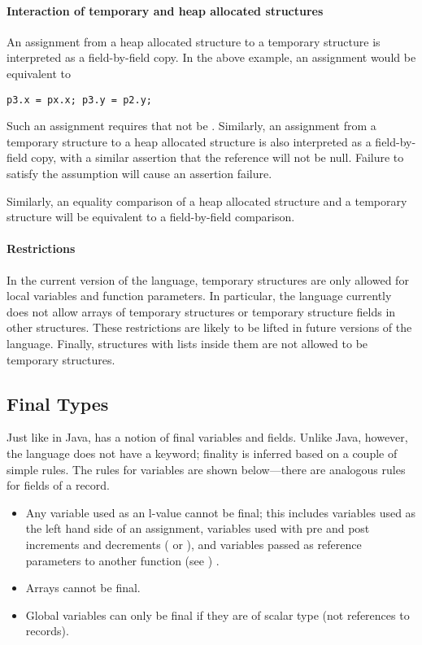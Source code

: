 \paragraph{Interaction of temporary and heap allocated structures}
An assignment from a heap allocated structure to a temporary structure is interpreted as a field-by-field copy. In the above example, an assignment  would be equivalent to
\begin{lstlisting}
p3.x = px.x; p3.y = p2.y;
\end{lstlisting}
Such an assignment requires that  not be . Similarly, an assignment from a temporary structure to a heap allocated structure is also interpreted as a field-by-field copy, with a similar assertion that the reference will not be null. Failure to satisfy the assumption will cause an assertion failure.

Similarly, an equality comparison of a heap allocated structure and a temporary structure will be equivalent to a field-by-field comparison.

\paragraph{Restrictions}
In the current version of the language, temporary structures are only allowed for local variables and function parameters. In particular, the language currently does not allow arrays of temporary structures or temporary structure fields in other structures. These restrictions are likely to be lifted in future versions of the language. Finally, structures with lists inside them are not allowed to be temporary structures.




\subsection{Final Types}
Just like in Java, \Sk{} has a notion of final variables and fields. Unlike Java, however, the language does not have a  keyword; finality is inferred based on a couple of simple rules. The rules for variables are shown below---there are analogous rules for fields of a record.

\begin{itemize}
\item Any variable used as an l-value cannot be final; this includes variables used as the left hand side of an assignment, variables used with pre and post increments and decrements ( or ), and variables passed as reference parameters to another function (see ) .
\item Arrays cannot be final.
\item Global variables can only be final if they are of scalar type (not references to records).
\end{itemize}

